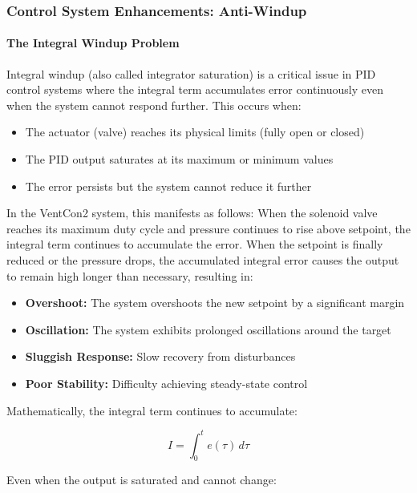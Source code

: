 \documentclass[12pt,a4paper]{article}
\begin{document}
\subsubsection{Control System Enhancements: Anti-Windup}

\paragraph{The Integral Windup Problem}
Integral windup (also called integrator saturation) is a critical issue in PID control systems where the integral term accumulates error continuously even when the system cannot respond further. This occurs when:

\begin{itemize}
    \item The actuator (valve) reaches its physical limits (fully open or closed)
    \item The PID output saturates at its maximum or minimum values
    \item The error persists but the system cannot reduce it further
\end{itemize}

In the VentCon2 system, this manifests as follows: When the solenoid valve reaches its maximum duty cycle and pressure continues to rise above setpoint, the integral term continues to accumulate the error. When the setpoint is finally reduced or the pressure drops, the accumulated integral error causes the output to remain high longer than necessary, resulting in:

\begin{itemize}
    \item \textbf{Overshoot:} The system overshoots the new setpoint by a significant margin
    \item \textbf{Oscillation:} The system exhibits prolonged oscillations around the target
    \item \textbf{Sluggish Response:} Slow recovery from disturbances
    \item \textbf{Poor Stability:} Difficulty achieving steady-state control
\end{itemize}

Mathematically, the integral term continues to accumulate:

\begin{equation}
I = \int_0^t e(\tau) \, d\tau
\end{equation}

Even when the output is saturated and cannot change:
\end{document}
